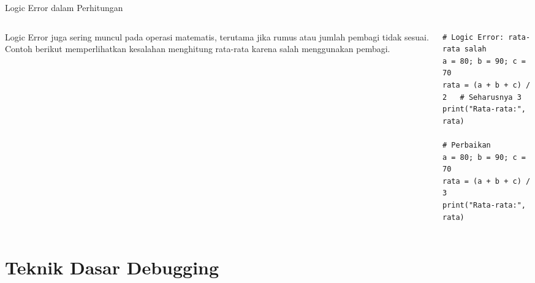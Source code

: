 \documentclass[aspectratio=169, table]{beamer}
\begin{document}
\begin{frame}[fragile]{Logic Error dalam Perhitungan}
\vspace{20pt}

\begin{columns}[T]
    \begin{column}{0.40\linewidth}
        Logic Error juga sering muncul pada operasi matematis, terutama jika rumus
        atau jumlah pembagi tidak sesuai.  
        Contoh berikut memperlihatkan kesalahan menghitung rata-rata karena salah
        menggunakan pembagi.
    \end{column}

    \begin{column}{0.55\linewidth}
\begin{lstlisting}[style=PythonStyle, basicstyle=\ttfamily\scriptsize]
# Logic Error: rata-rata salah
a = 80; b = 90; c = 70
rata = (a + b + c) / 2   # Seharusnya 3
print("Rata-rata:", rata)

# Perbaikan
a = 80; b = 90; c = 70
rata = (a + b + c) / 3
print("Rata-rata:", rata)
\end{lstlisting}
    \end{column}
\end{columns}

\end{frame}

\section{Teknik Dasar Debugging}
\end{document}
